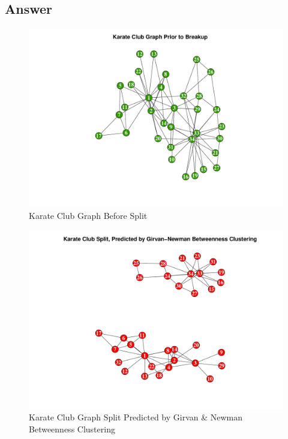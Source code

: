 \documentclass[letterpaper,11pt]{article}
\begin{document}
\newpage
\subsection*{Answer}

\begin{figure}[h]
\includegraphics[scale=0.5]{club-before.pdf}
\caption{Karate Club Graph Before Split}
\label{fig:club-before}
\end{figure}

\begin{figure}[h]
\includegraphics[scale=0.5]{club-after.pdf}
\caption{Karate Club Graph Split Predicted by Girvan \& Newman Betweenness Clustering}
\label{fig:club-after}
\end{figure}

\newpage

\end{document}
